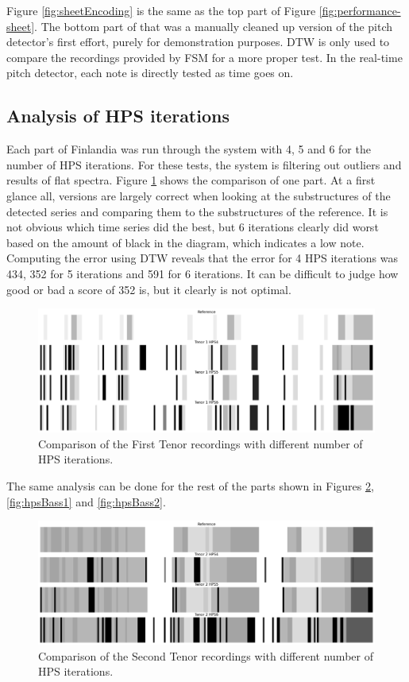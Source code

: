Figure \ref{fig:sheetEncoding} is the same as the top part of Figure \ref{fig:performance-sheet}. The bottom part of that was a manually cleaned up version of the pitch detector's first effort, purely for demonstration purposes. DTW is only used to compare the recordings provided by FSM for a more proper test. In the real-time pitch detector, each note is directly tested as time goes on.

\subsection{Analysis of HPS iterations}
Each part of Finlandia was run through the system with 4, 5 and 6 for the number of HPS iterations. For these tests, the system is filtering out outliers and results of flat spectra. Figure \ref{fig:hpsTenor1} shows the comparison of one part. At a first glance all, versions are largely correct when looking at the substructures of the detected series and comparing them to the substructures of the reference. It is not obvious which time series did the best, but 6 iterations clearly did worst based on the amount of black in the diagram, which indicates a low note. Computing the error using DTW reveals that the error for 4 HPS iterations was 434, 352 for 5 iterations and 591 for 6 iterations. It can be difficult to judge how good or bad a score of 352 is, but it clearly is not optimal.

\begin{figure}[ht]
    \centering
    \includegraphics[width=\textwidth]{./images/hpsTenor1.png}
    \caption{Comparison of the First Tenor recordings with different number of HPS iterations. \label{fig:hpsTenor1}}
\end{figure}

The same analysis can be done for the rest of the parts shown in Figures \ref{fig:hpsTenor2}, \ref{fig:hpsBass1} and \ref{fig:hpsBass2}.

\begin{figure}[ht]
    \centering
    \includegraphics[width=\textwidth]{./images/hpsTenor2.png}
    \caption{Comparison of the Second Tenor recordings with different number of HPS iterations. \label{fig:hpsTenor2}}
\end{figure}


